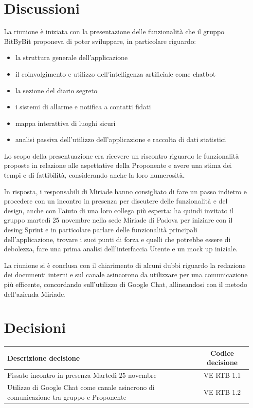 \documentclass[a4paper,12pt]{article}
\newcommand{\ignoreglossary}{}
\begin{document}
\section{Discussioni}
La riunione \`e iniziata con la presentazione delle funzionalit\`a che il gruppo BitByBit proponeva di poter sviluppare, in particolare riguardo:
\begin{itemize}
    \item la struttura generale dell'applicazione
    \item il coinvolgimento e utilizzo dell'intelligenza artificiale come chatbot
    \item la sezione del diario segreto
    \item i sistemi di allarme e notifica a contatti fidati
    \item mappa interattiva di luoghi sicuri
    \item analisi passiva dell'utilizzo dell'applicazione e raccolta di dati statistici
\end{itemize}
Lo scopo della presentuazione era ricevere un riscontro riguardo le funzionalità proposte in relazione alle aspettative della Proponente e avere una stima dei tempi e di fattibilit\`a, considerando anche la loro numerosit\`a.

In risposta, i responsabili di Miriade hanno consigliato di fare un passo indietro e procedere con un incontro in presenza per discutere delle funzionalità e del design, anche con l'aiuto di una loro collega pi\`u esperta: ha quindi invitato il gruppo marted\`i  25 novembre nella sede Miriade di Padova per iniziare con il desing Sprint e in particolare parlare delle funzionalit\`a principali dell'applicazione, trovare i suoi punti di forza e quelli che potrebbe essere di debolezza, fare una prima analisi dell'interfaccia Utente e un mock up iniziale.

La riunione si \`e conclusa con il chiarimento di alcuni dubbi riguardo la redazione dei documenti interni e sul canale asincorono da utilizzare per una comunicazione pi\`u efficente, concordando sull'utilizzo di Google Chat, allineandosi con il metodo dell'azienda Miriade.


\section{Decisioni}
\begin{center}
\small
\renewcommand{\arraystretch}{1.2} 
\begin{tabular}{|p{}|c|}
\hline
\rowcolor{gray!60} 
\textbf{Descrizione decisione} & \textbf{Codice decisione} \\
\hline
\rowcolor{white}
Fissato incontro in presenza Marted\`i 25 novembre & VE \ignoreglossary{RTB} 1.1 \\
\hline
\rowcolor{gray!20}
Utilizzo di Google Chat come canale asincrono di comunicazione tra gruppo e Proponente &  VE \ignoreglossary{RTB} 1.2 \\
\hline
\end{tabular}
\end{center}
\end{document}
